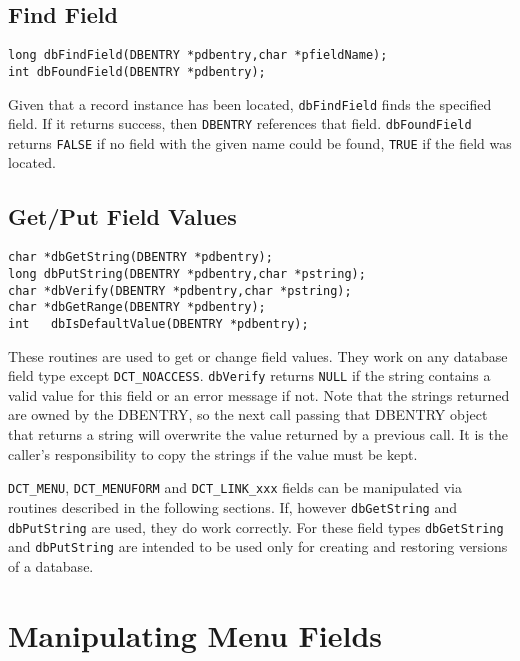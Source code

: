 \subsection{Find Field}

\begin{verbatim}
long dbFindField(DBENTRY *pdbentry,char *pfieldName);
int dbFoundField(DBENTRY *pdbentry);

\end{verbatim}

Given that a record instance has been located, \verb|dbFindField| finds the specified field.
If it returns success, then \verb|DBENTRY| references that field.
\verb|dbFoundField| returns \verb|FALSE| if no field with the given name could be found, \verb|TRUE| if the field was located.

\subsection{Get/Put Field Values}

\begin{verbatim}
char *dbGetString(DBENTRY *pdbentry);
long dbPutString(DBENTRY *pdbentry,char *pstring);
char *dbVerify(DBENTRY *pdbentry,char *pstring);
char *dbGetRange(DBENTRY *pdbentry);
int   dbIsDefaultValue(DBENTRY *pdbentry);
\end{verbatim}

These routines are used to get or change field values.
They work on any database field type except \verb|DCT_NOACCESS|.
\verb|dbVerify| returns \verb|NULL| if the string contains a valid value for this field or an error message if not.
Note that the strings returned are owned by the DBENTRY, so the next call passing that DBENTRY object that returns a string will overwrite the value returned by a previous call.
It is the caller's responsibility to copy the strings if the value must be kept.

\verb|DCT_MENU|, \verb|DCT_MENUFORM| and \verb|DCT_LINK_xxx| fields can be manipulated via routines described in the following sections.
If, however \verb|dbGetString| and \verb|dbPutString| are used, they do work correctly.
For these field types \verb|dbGetString| and \verb|dbPutString| are intended to be used only for creating and restoring versions of a database.

\section{Manipulating Menu Fields}

